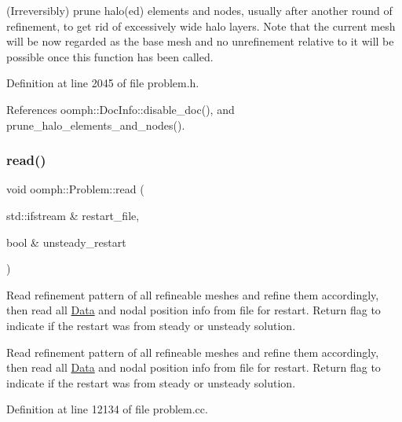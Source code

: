(Irreversibly) prune halo(ed) elements and nodes, usually after another round of refinement, to get rid of excessively wide halo layers. Note that the current mesh will be now regarded as the base mesh and no unrefinement relative to it will be possible once this function has been called. 



Definition at line 2045 of file problem.\+h.



References oomph\+::\+Doc\+Info\+::disable\+\_\+doc(), and prune\+\_\+halo\+\_\+elements\+\_\+and\+\_\+nodes().

\mbox{\label{classoomph_1_1Problem_ae27a3057515ddaa60d2ecc684d517e8f}} 
\subsubsection{\texorpdfstring{read()}{read()}\hspace{0.1cm}{\footnotesize\ttfamily [1/2]}}
{\footnotesize\ttfamily void oomph\+::\+Problem\+::read (\begin{DoxyParamCaption}\item[{std\+::ifstream \&}]{restart\+\_\+file,  }\item[{bool \&}]{unsteady\+\_\+restart }\end{DoxyParamCaption})\hspace{0.3cm}{\ttfamily [virtual]}}



Read refinement pattern of all refineable meshes and refine them accordingly, then read all \hyperlink{classoomph_1_1Data}{Data} and nodal position info from file for restart. Return flag to indicate if the restart was from steady or unsteady solution. 

Read refinement pattern of all refineable meshes and refine them accordingly, then read all \hyperlink{classoomph_1_1Data}{Data} and nodal position info from file for restart. Return flag to indicate if the restart was from steady or unsteady solution. 

Definition at line 12134 of file problem.\+cc.



